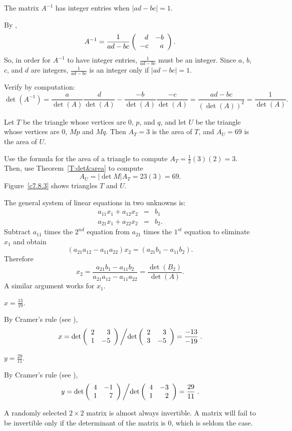 \documentclass{ximera}
\begin{document}
\ans The matrix $A^{-1}$ has integer entries when $|ad - bc| = 1$.

\soln By ,
\[
A^{-1} = \frac{1}{ad-bc}\left(\begin{array}{rr} d & -b\\ -c &a\end{array}\right).
\]
So, in order for $A^{-1}$ to have integer entries, $\frac{1}{ad-bc}$
must be an integer.  Since $a$, $b$, $c$, and $d$ are integers,
$\frac{1}{ad - bc}$ is an integer only if $|ad - bc| = 1$.


Verify by computation:
\[ \det(A^{-1}) = \frac{a}{\det(A)}\frac{d}{\det(A)} -
\frac{-b}{\det(A)}\frac{-c}{\det(A)} = \frac{ad - bc}{(\det(A))^2} =
\frac{1}{\det(A)}. \]

\ans Let $T$ be the triangle whose vertices are $0$, $p$, and $q$, and
let $U$ be the triangle whose vertices are $0$, $Mp$ and $Mq$.  Then
$A_T = 3$ is the area of $T$, and $A_U = 69$ is the area of $U$.

\soln Use the formula for the area of a triangle to compute
$A_T = \frac{1}{2}(3)(2) = 3$.  Then, use Theorem~\ref{T:det&area} to
compute
\[
A_U = |\det{M}|A_T = 23(3) = 69.
\]
Figure~\ref{c7.8.3} shows triangles $T$ and $U$.

\begin{figure}[htb]
		\centerline{%
		}
\end{figure}

The general system of linear equations in two unknowns is:
\begin{eqnarray*}
a_{11}x_1+a_{12}x_2 & = & b_1\\
a_{21}x_1+a_{22}x_2 & = & b_2.
\end{eqnarray*}
Subtract $a_{11}$ times the $2^{nd}$ equation from $a_{21}$ times the $1^{st}$ 
equation to eliminate $x_1$ and obtain
\[
(a_{21}a_{12}-a_{11}a_{22})x_2 = (a_{21}b_1-a_{11}b_2).
\]
Therefore
\[
x_2 =  \frac{a_{21}b_1-a_{11}b_2}{a_{21}a_{12}-a_{11}a_{22}}
= \frac{\det(B_2)}{\det(A)}.
\]
A similar argument works for $x_1$.

  \ans  $x=\frac{13}{19}$.

\soln By Cramer's rule (see ),
\[
x = \det\left(\begin{array}{rr} 2 & 3\\ 1 &-5\end{array}\right)\left/\det\left(\begin{array}{rr} 2 & 3\\ 3 &-5\end{array}\right)=\frac{-13}{-19}\right..
\]
 

 \ans  $y=\frac{29}{11}$.

\soln By Cramer's rule (see ),
\[
y = \det\left(\begin{array}{rr} 4 & -1\\ 1 &7\end{array}\right)\left/\det\left(\begin{array}{rr} 4 & -3\\ 1 &2\end{array}\right)=\frac{29}{11}\right..
\]

A randomly selected $2 \times 2$ matrix is almost always invertible.
A matrix will fail to be invertible only if the determinant of the
matrix is $0$, which is seldom the case.
\end{document}
